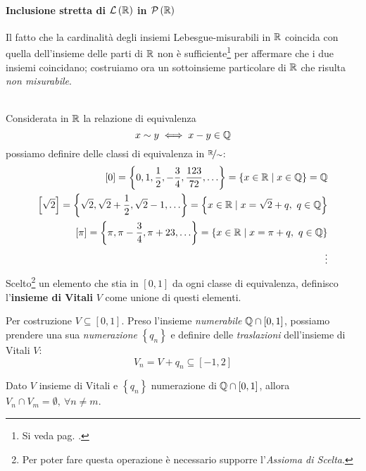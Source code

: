 \paragraph{Inclusione stretta di {$\mathcal{L}\left(\mathbb{R}\right)$} in {$\mathcal{P}\left(\mathbb{R}\right)$}} %
Il fatto che la cardinalità degli insiemi Lebesgue-misurabili in $\mathbb{R}$ coincida con quella dell'insieme delle parti di $\mathbb{R}$ non è sufficiente\footnote{Si veda pag. \pageref{cardinalitàugualenonimplicauguaglianzainsiemistica}.} per affermare che i due insiemi coincidano; costruiamo ora un sottoinsieme particolare di $\mathbb{R}$ che risulta \textit{non misurabile}.\\
\begin{define}~{}\\
	Considerata in $\mathbb{R}$ la relazione di equivalenza
	\begin{equation}
		x\sim y\iff x-y\in\mathbb{Q}
	\end{equation}
	possiamo definire delle classi di equivalenza in $\nicefrac{\mathbb{R}}{\sim}$:
	\begin{align*}
		\left[0\right]=\left\{0,1,\frac{1}{2},-\frac{3}{4},\frac{123}{72},\ldots\right\}=\left\{x\in\mathbb{R}\mid x\in\mathbb{Q}\right\}=\mathbb{Q}\\
		\left[\sqrt{2}\right]=\left\{\sqrt{2},\sqrt{2}+\frac{1}{2},\sqrt{2}-1,\ldots\right\}=\left\{x\in\mathbb{R}\mid x=\sqrt{2}+q,\ q\in\mathbb{Q}\right\}\\
		\left[\pi\right]=\left\{\pi,\pi-\frac{3}{4},\pi+23,\ldots\right\}=\left\{x\in\mathbb{R}\mid x=\pi+q,\ q\in\mathbb{Q}\right\}\\
		\vdots
	\end{align*}
	Scelto\footnote{Per poter fare questa operazione è necessario supporre l'\textit{Assioma di Scelta}.} un elemento che stia in $\left[0,1\right]$ da ogni classe di equivalenza, definisco l'\textbf{insieme di Vitali} $V$ come unione di questi elementi.
\end{define}
Per costruzione $V\subseteq\left[0,1\right]$. Preso l'insieme \textit{numerabile} $\mathbb{Q}\cap\left[0,1\right]$, possiamo prendere una sua \textit{numerazione} $\left\{q_n\right\}$ e definire delle \textit{traslazioni} dell'insieme di Vitali $V$:
\begin{equation*}
	V_n=V+q_n\subseteq\left[-1,2\right]
\end{equation*}
\begin{lemming}
	Dato $V$ insieme di Vitali e $\left\{q_n\right\}$ numerazione di $\mathbb{Q}\cap\left[0,1\right]$, allora $V_n\cap V_m=\emptyset,\ \forall n\neq m$.
\end{lemming}
